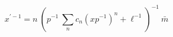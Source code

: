 \begin{equation}
x^{'-1} = n~(p^{-1}~\sum_{n} c_{n}(xp^{-1})^{n}+\ell^{-1})^{-1}~\bar{m}    \label{101}
\end{equation}

